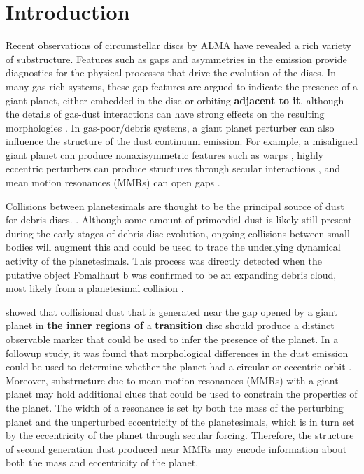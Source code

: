 \documentclass[fleqn,usenatbib]{mnras}
\begin{document}
\section{Introduction} \label{sec:intro}

Recent observations of circumstellar discs by ALMA have revealed a rich variety of substructure. Features such as gaps and asymmetries 
\citep{2015ApJ...808L...3A, 2016Sci...353.1519P, PhysRevLett.117.251101, 2016ApJ...820L..40A, 2016Natur.535..258C} in the emission provide 
diagnostics for the physical processes that drive the evolution of the discs. In many gas-rich systems, these gap features are argued to indicate the 
presence of a giant planet, either embedded in the disc \citep{2015MNRAS.453L..73D} or orbiting \textbf{adjacent to it}, although the details of gas-dust 
interactions can have strong effects on the resulting morphologies
\citep{2018ApJ...866..110D}. In gas-poor/debris systems, a giant
planet perturber can also influence 
the structure of the dust continuum emission. For example, a misaligned giant planet can produce nonaxisymmetric features such as warps 
\citep{2001A&A...370..447A}, highly eccentric perturbers can produce structures through secular interactions 
\citep{2014MNRAS.443.2541P, 2015MNRAS.448.3679P}, and mean motion resonances (MMRs) can open gaps
\citep{2015ApJ...798...83N, 2016ApJ...818..159T, 2018ApJ...857....3T}.

Collisions between planetesimals are thought to be the principal source of dust for debris discs. \citep[see][]{2008ARA&A..46..339W}.  Although some 
amount of primordial dust is likely still present during the early stages of debris disc evolution, ongoing collisions between small bodies will augment 
this and could be used to trace the underlying dynamical activity of the planetesimals. This process was directly detected when the putative object 
Fomalhaut b was confirmed to be an expanding debris cloud, most likely from a planetesimal collision \citep{2020PNAS..117.9712G}. 

\citet{2013ApJ...777L..31D} showed that collisional dust that is generated near the gap opened by a giant planet in \textbf{the inner regions of} a \textbf{transition} disc should 
produce a distinct observable marker that could be used to infer the presence of the planet. In a followup study, it was found that morphological 
differences in the dust emission could be used to determine whether the planet had a circular or eccentric orbit \citep{2016ApJ...820...29D}. Moreover, 
substructure due to mean-motion resonances (MMRs) with a giant planet may hold additional clues that could be used to constrain the properties of 
the planet.  The width of a resonance is set by both the mass of the perturbing planet and the unperturbed eccentricity of the planetesimals, 
which is in turn set by the eccentricity of the planet through secular forcing. Therefore, the structure of second generation dust produced near MMRs 
may encode information about both the mass and eccentricity of the planet.
\end{document}
